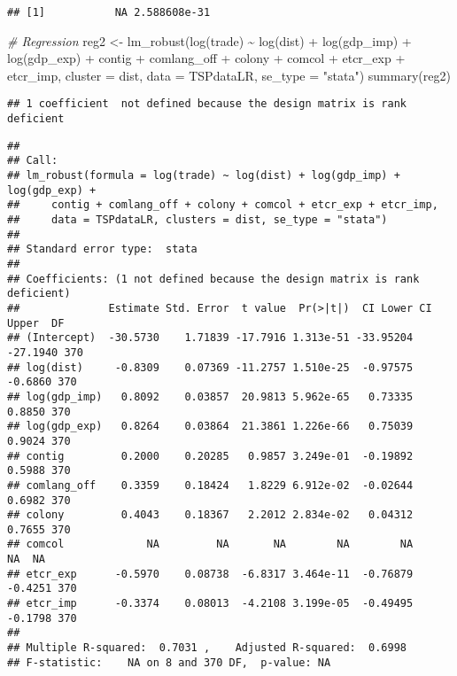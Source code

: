 \documentclass[
]{article}
\newenvironment{Shaded}{\begin{snugshade}}{\end{snugshade}}
\newcommand{\AttributeTok}[1]{\textcolor[rgb]{0.77,0.63,0.00}{#1}}
\newcommand{\CommentTok}[1]{\textcolor[rgb]{0.56,0.35,0.01}{\textit{#1}}}
\newcommand{\FunctionTok}[1]{\textcolor[rgb]{0.00,0.00,0.00}{#1}}
\newcommand{\NormalTok}[1]{#1}
\newcommand{\OtherTok}[1]{\textcolor[rgb]{0.56,0.35,0.01}{#1}}
\newcommand{\SpecialCharTok}[1]{\textcolor[rgb]{0.00,0.00,0.00}{#1}}
\newcommand{\StringTok}[1]{\textcolor[rgb]{0.31,0.60,0.02}{#1}}
\begin{document}
\begin{verbatim}
## [1]           NA 2.588608e-31
\end{verbatim}

\begin{Shaded}
\begin{Highlighting}[]
\CommentTok{\# Regression}
\NormalTok{reg2 }\OtherTok{\textless{}{-}} \FunctionTok{lm\_robust}\NormalTok{(}\FunctionTok{log}\NormalTok{(trade) }\SpecialCharTok{\textasciitilde{}} \FunctionTok{log}\NormalTok{(dist) }\SpecialCharTok{+} \FunctionTok{log}\NormalTok{(gdp\_imp) }\SpecialCharTok{+} \FunctionTok{log}\NormalTok{(gdp\_exp) }\SpecialCharTok{+}
\NormalTok{contig }\SpecialCharTok{+}\NormalTok{ comlang\_off }\SpecialCharTok{+}\NormalTok{ colony }\SpecialCharTok{+}\NormalTok{ comcol }\SpecialCharTok{+}\NormalTok{ etcr\_exp }\SpecialCharTok{+}
\NormalTok{etcr\_imp, }\AttributeTok{cluster =}\NormalTok{ dist, }\AttributeTok{data =}\NormalTok{ TSPdataLR,}
\AttributeTok{se\_type =} \StringTok{"stata"}\NormalTok{)}
\FunctionTok{summary}\NormalTok{(reg2)}
\end{Highlighting}
\end{Shaded}

\begin{verbatim}
## 1 coefficient  not defined because the design matrix is rank deficient
\end{verbatim}

\begin{verbatim}
## 
## Call:
## lm_robust(formula = log(trade) ~ log(dist) + log(gdp_imp) + log(gdp_exp) + 
##     contig + comlang_off + colony + comcol + etcr_exp + etcr_imp, 
##     data = TSPdataLR, clusters = dist, se_type = "stata")
## 
## Standard error type:  stata 
## 
## Coefficients: (1 not defined because the design matrix is rank deficient)
##              Estimate Std. Error  t value  Pr(>|t|)  CI Lower CI Upper  DF
## (Intercept)  -30.5730    1.71839 -17.7916 1.313e-51 -33.95204 -27.1940 370
## log(dist)     -0.8309    0.07369 -11.2757 1.510e-25  -0.97575  -0.6860 370
## log(gdp_imp)   0.8092    0.03857  20.9813 5.962e-65   0.73335   0.8850 370
## log(gdp_exp)   0.8264    0.03864  21.3861 1.226e-66   0.75039   0.9024 370
## contig         0.2000    0.20285   0.9857 3.249e-01  -0.19892   0.5988 370
## comlang_off    0.3359    0.18424   1.8229 6.912e-02  -0.02644   0.6982 370
## colony         0.4043    0.18367   2.2012 2.834e-02   0.04312   0.7655 370
## comcol             NA         NA       NA        NA        NA       NA  NA
## etcr_exp      -0.5970    0.08738  -6.8317 3.464e-11  -0.76879  -0.4251 370
## etcr_imp      -0.3374    0.08013  -4.2108 3.199e-05  -0.49495  -0.1798 370
## 
## Multiple R-squared:  0.7031 ,    Adjusted R-squared:  0.6998 
## F-statistic:    NA on 8 and 370 DF,  p-value: NA
\end{verbatim}
\end{document}
